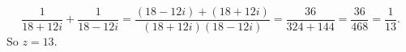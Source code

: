 \[\dfrac1{18+12i}+\dfrac1{18-12i}=\dfrac{(18-12i)+(18+12i)}{(18+12i)(18-12i)}=\dfrac{36}{324+144}=\dfrac{36}{468}=\dfrac1{13}.\]
So $z=\boxed{13}$.
